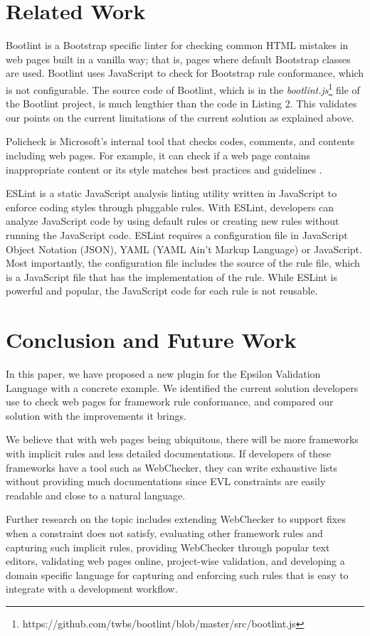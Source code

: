 \documentclass[conference]{IEEETran}
\begin{document}
\section{Related Work}
Bootlint \cite{bootlint} is a Bootstrap specific linter for checking common HTML mistakes in web pages built in a vanilla way; that is, pages where default Bootstrap classes are used. Bootlint uses JavaScript to check for Bootstrap rule conformance, which is not configurable. The source code of Bootlint, which is in the \textit{bootlint.js}\footnote{https://github.com/twbs/bootlint/blob/master/src/bootlint.js} file of the Bootlint project, is much lengthier than the code in Listing 2. This validates our points on the current limitations of the current solution as explained above. 

Policheck is Microsoft's internal tool that checks codes, comments, and contents including web pages. For example, it can check if a web page contains inappropriate content or its style matches best practices and guidelines \cite{christakis16}.

ESLint \cite{eslint} is a static JavaScript analysis linting utility written in JavaScript to enforce coding styles through pluggable rules. With ESLint, developers can analyze JavaScript code by using default rules or creating new rules without running the JavaScript code. ESLint requires a configuration file in JavaScript Object Notation (JSON), YAML (YAML Ain't Markup Language) or JavaScript. Most importantly, the configuration file includes the source of the rule file, which is a JavaScript file that has the implementation of the rule. While ESLint is powerful and popular, the JavaScript code for each rule is not reusable.    
 


\section{Conclusion and Future Work}

In this paper, we have proposed a new plugin for the Epsilon Validation Language with a concrete example. We identified the current solution developers use to check web pages for framework rule conformance, and compared our solution with the improvements it brings. 

We believe that with web pages being ubiquitous, there will be more frameworks with implicit rules and less detailed documentations. If developers of these frameworks have a tool such as WebChecker, they can write exhaustive lists without providing much documentations since EVL constraints are easily readable and close to a natural language. 

Further research on the topic includes extending WebChecker to support fixes when a constraint does not satisfy, evaluating other framework rules and capturing such implicit rules, providing WebChecker through popular text editors, validating web pages online, project-wise validation, and developing a domain specific language for capturing and enforcing such rules that is easy to integrate with a development workflow.


 
\end{document}

